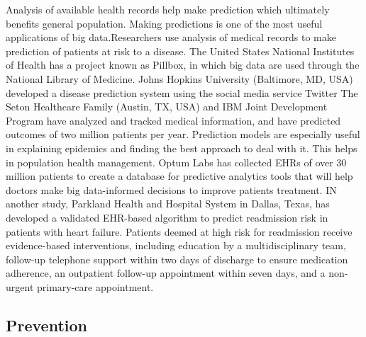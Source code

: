 \documentclass[sigconf]{acmart}
\begin{document}
Analysis of available health records help make prediction which ultimately benefits general population. Making predictions is 
one of the most useful applications of big data.Researchers use analysis of medical records to make prediction of patients at 
risk to a disease. The United States National Institutes of Health has a project known as Pillbox, in which big data are
used through the National Library of Medicine\cite{www-tandf-com}. Johns Hopkins University (Baltimore, MD, USA) developed a disease 
prediction system using the social media service Twitter\cite{www-ncbi-nlm-nih-gov}
The Seton Healthcare Family (Austin, TX, USA) and IBM Joint Development Program have analyzed and tracked medical information, 
and have predicted outcomes of two million patients per
year\cite{www-uhcjsc-com}. Prediction models are especially useful in explaining epidemics and finding the best approach to
deal with it. This helps in population health management. Optum Labs has collected EHRs of over 30 million patients to create a 
database for predictive analytics tools that will help doctors make big 
data-informed decisions to improve patients treatment\cite{www-mapr-com}. IN another study, Parkland Health and Hospital System 
in Dallas, Texas, has developed a validated EHR-based algorithm to predict readmission risk in patients with heart failure.
Patients deemed at high risk for readmission receive evidence-based interventions, including education by a multidisciplinary 
team, follow-up telephone support within two days of discharge to ensure medication adherence, an outpatient follow-up 
appointment within seven days, and a non-urgent primary-care appointment\cite{www-google-com}.


\subsection{Prevention}
\end{document}
